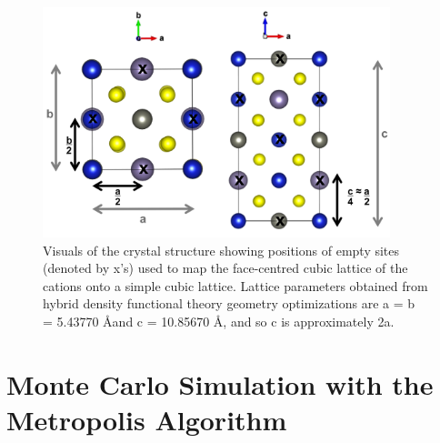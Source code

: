 \begin{figure}[h!]
  \centering
    \includegraphics[width=0.9\textwidth]{figures/CZTS_lattice_scaling.png}
    \caption{Visuals of the { \CZTS } crystal structure showing positions of empty sites (denoted by x's) used to map the face-centred cubic lattice of the cations onto a simple cubic lattice. Lattice parameters obtained from hybrid density functional theory geometry optimizations are a = b = 5.43770 \AA and c = 10.85670 \AA, and so c is approximately 2a.}
  \label{CZTS_lattice_scaling}
\end{figure}


\section{Monte Carlo Simulation with the Metropolis Algorithm}

